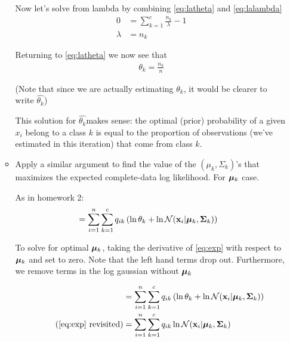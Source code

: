 \documentclass[submit]{harvardml}
\newenvironment{answer}{%
\color{answergreen}\sffamily\large}{}
\newcommand{\bx}{\mathbf{x}} %
\begin{document}
\begin{enumerate}
\begin{itemize}
\begin{answer}
                Now let's solve from lambda by combining \cref{eq:latheta} and \cref{eq:lalambda}
                \begin{align}
                    0 &= \sum_{k=1}^c \frac{n_k}{\lambda} - 1 \\
                    \lambda &= n_k
                \end{align}

                Returning to \cref{eq:latheta} we now see that
                \begin{align}
                    \theta_k = \frac{n_k}{n}     
                \end{align}

                (Note that since we are actually estimating $\theta_k$, it would be clearer to
                write $\hat{\theta_k}$)

                This solution for $\hat{\theta_k} $makes sense: the optimal (prior) probability
                of a given $x_i$ belong to a class $k$ is equal to the proportion of
                observations (we've estimated in this iteration) that come from class $k$.

            \end{answer}


        \item Apply a similar argument to find the value of the $(\mu_k,\Sigma_k)$'s that
            maximizes the expected complete-data log likelihood. For  $\boldsymbol{\mu}_k$ case.

            \begin{answer}
                As in homework 2:
                \begin{align}
                    &= \sum_{i=1}^n \sum_{k=1}^c q_{ik} \left(\ln\theta_k + 
                \ln \mathcal{N}(\bx_i | \bmu_k, \bSigma_k ) \right)  \label{eq:exp}
            \end{align}

            To solve for optimal $\boldsymbol{\mu}_k$, taking the derivative of \cref{eq:exp} with respect
            to $\boldsymbol{\mu}_k$ and set to zero. Note that the left hand terms drop out. Furthermore, we
            remove terms in the log gaussian without $\boldsymbol{\mu}_k$ 

            \begin{align*}
                &= \sum_{i=1}^n \sum_{k=1}^c q_{ik} \left(\ln\theta_k + 
            \ln \mathcal{N}(\bx_i | \bmu_k, \bSigma_k )\right) \\ \tag{\ref{eq:exp} revisited}
            &= \sum_{i=1}^n \sum_{k=1}^c q_{ik} \ln \mathcal{N}(\bx_i | \bmu_k, \bSigma_k)
        \end{align*}


\end{answer}
\end{itemize}
\end{enumerate}
\end{document}
